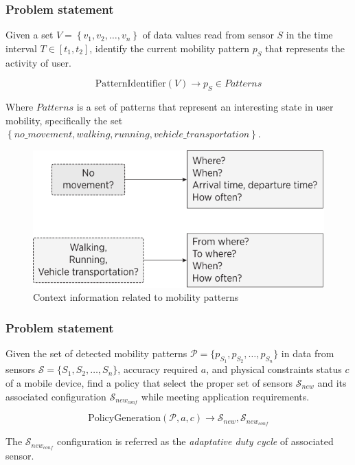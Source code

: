 \documentclass[compress,9pt,xcolor={dvipsnames,table}]{beamer}
\begin{document}
\begin{frame}\frametitle{Problem statement}
\begin{tcolorbox}[title=Problem statement: Mobility pattern identification,colframe=PineGreen]
\small
Given a set $V = \left\{v_{1}, v_{2}, \dotsc, v_{n}\right\}$ of data values read from sensor $S$ in the time interval $T  \in [t_{1}, t_{2}]$, identify the current mobility pattern $p_{S}$ that represents the activity of user.

\begin{equation}
  \text{PatternIdentifier}( V ) \longrightarrow{} p_{S} \in Patterns
\end{equation}

Where $Patterns$ is a set of patterns that represent an interesting state in user mobility, specifically the set $\left\{no\_movement, walking, running, vehicle\_transportation\right\}$.

\begin{figure}[tb]
  \centering
  \includegraphics[scale=0.5]{../../../resources/images/vectors/mobility-patterns-implications}
  \caption{Context information related to mobility patterns}
  \label{fig:mobility-patterns-implications}
\end{figure}

\end{tcolorbox}




\end{frame}

\begin{frame}\frametitle{Problem statement}
\begin{tcolorbox}[title=Problem statement: Policy generation,colframe=PineGreen]
\small
Given the set of detected mobility patterns $\mathcal{P} = \{ p_{S_1}, p_{S_2}, \ldots, p_{S_n} \}$ in data from sensors $\mathcal{S} = \{ S_1,S_2,\ldots, S_n \}$, accuracy required $a$, and physical constraints status $c$ of a mobile device, find a policy that select the proper set of sensors $\mathcal{S}_{new}$ and its associated configuration $\mathcal{S}_{new_{conf}}$  while meeting application requirements.

\begin{equation}
  \text{PolicyGeneration}( \mathcal{P}, a, c ) \longrightarrow{} \mathcal{S}_{new}, \mathcal{S}_{new_{conf}}
\end{equation}

The $\mathcal{S}_{new_{conf}}$ configuration is referred as the \emph{adaptative duty cycle} of associated sensor.
\end{tcolorbox}
\end{frame}
\end{document}
